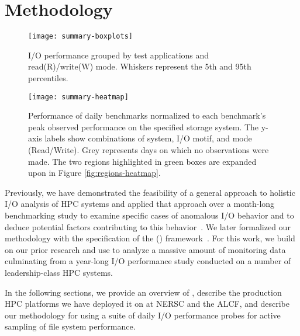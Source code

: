 \section{Methodology}\label{sec:methods}

\begin{figure}
    \centering
    \texttt{[image: summary-boxplots]}
    \vspace{-.15in}
    \caption{I/O performance grouped by test applications and read(R)/write(W) mode.  Whiskers represent the 5th and 95th percentiles.}
    \label{fig:summary-boxplots}
\end{figure}

\begin{figure*}
    \centering
    \texttt{[image: summary-heatmap]}
    \vspace{-.2in}
    \caption{Performance of daily benchmarks normalized to each benchmark's peak observed performance on the specified storage system.  The y-axis labels show combinations of system, I/O motif, and mode (Read/Write).  Grey represents days on which no observations were made.  The two regions highlighted in green boxes are expanded upon in Figure \ref{fig:regions-heatmap}.}
    \label{fig:summary-heatmap}
\end{figure*}



Previously, we have demonstrated the feasibility of a general approach to holistic I/O analysis of HPC systems and applied that approach over a month-long benchmarking study to examine specific cases of anomalous I/O behavior and to deduce potential factors contributing to this behavior~\cite{Lockwood2017}. We later formalized our methodology with the specification of the \tokio (\tokiolong) framework~\cite{Lockwood2018tokio}. For this work, we build on our prior research and use \tokio to analyze a massive amount of monitoring data culminating from a year-long I/O performance study conducted on a number of leadership-class HPC systems. 

In the following sections, we provide an overview of \tokio, describe the production HPC platforms we have deployed it on at NERSC and the ALCF, and describe our methodology for using a suite of daily I/O performance probes for active sampling of file system performance.

